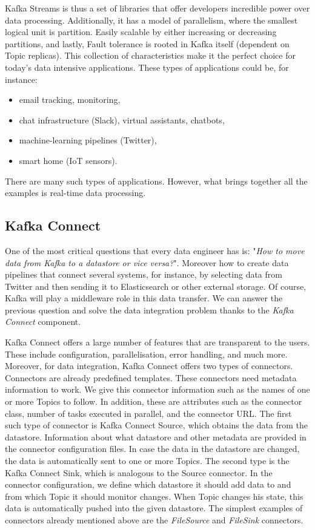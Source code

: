 Kafka Streams is thus a set of libraries that offer developers incredible power over data processing.
Additionally, it has a model of parallelism, where the smallest logical unit is partition.
Easily scalable by either increasing or decreasing partitions, and lastly, Fault tolerance is rooted in Kafka itself (dependent on Topic replicas).
This collection of characteristics make it the perfect choice for today's data intensive applications.
These types of applications could be, for instance:
\begin{itemize}[itemsep=1mm, parsep=0pt]
    \item email tracking, monitoring,
    \item chat infrastructure (Slack), virtual assistants, chatbots,
    \item machine-learning pipelines (Twitter),
    \item smart home (IoT sensors).
\end{itemize}
There are many such types of applications.
However, what brings together all the examples is real-time data processing.

\subsection{Kafka Connect}

One of the most critical questions that every data engineer has is: "\emph{How to move data from Kafka to a datastore or vice versa?}".
Moreover how to create data pipelines that connect several systems, for instance, by selecting data from Twitter and then sending it to Elasticsearch or other external storage.
Of course, Kafka will play a middleware role in this data transfer.
We can answer the previous question and solve the data integration problem thanks to the \emph{Kafka Connect} component.

Kafka Connect offers a large number of features that are transparent to the users.
These include configuration, parallelisation, error handling, and much more.
Moreover, for data integration, Kafka Connect offers two types of connectors.
Connectors are already predefined templates.
These connectors need metadata information to work.
We give this connector information such as the names of one or more Topics to follow.
In addition, these are attributes such as the connector class, number of tasks executed in parallel, and the connector URL.
The first such type of connector is Kafka Connect Source, which obtains the data from the datastore.
Information about what datastore and other metadata are provided in the connector configuration files.
In case the data in the datastore are changed, the data is automatically sent to one or more Topics.
The second type is the Kafka Connect Sink, which is analogous to the Source connector.
In the connector configuration, we define which datastore it should add data to and from which Topic it should monitor changes.
When Topic changes his state, this data is automatically pushed into the given datastore.
The simplest examples of connectors already mentioned above are the \emph{FileSource} and \emph{FileSink} connectors.

